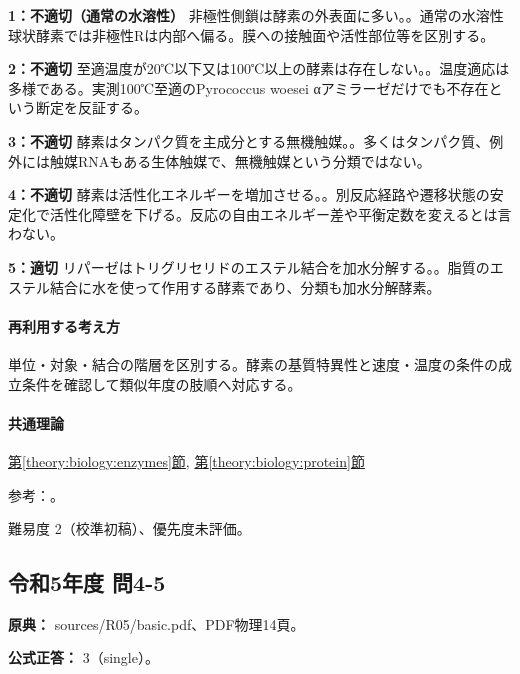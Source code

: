 \noindent\textbf{1：不適切（通常の水溶性）} 非極性側鎖は酵素の外表面に多い。。通常の水溶性球状酵素では非極性Rは内部へ偏る。膜への接触面や活性部位等を区別する。\par

\noindent\textbf{2：不適切} 至適温度が20℃以下又は100℃以上の酵素は存在しない。。温度適応は多様である。実測100℃至適のPyrococcus woesei αアミラーゼだけでも不存在という断定を反証する。\par

\noindent\textbf{3：不適切} 酵素はタンパク質を主成分とする無機触媒。。多くはタンパク質、例外には触媒RNAもある生体触媒で、無機触媒という分類ではない。\par

\noindent\textbf{4：不適切} 酵素は活性化エネルギーを増加させる。。別反応経路や遷移状態の安定化で活性化障壁を下げる。反応の自由エネルギー差や平衡定数を変えるとは言わない。\par

\noindent\textbf{5：適切} リパーゼはトリグリセリドのエステル結合を加水分解する。。脂質のエステル結合に水を使って作用する酵素であり、分類も加水分解酵素。\par

\paragraph{再利用する考え方} 単位・対象・結合の階層を区別する。酵素の基質特異性と速度・温度の条件の成立条件を確認して類似年度の肢順へ対応する。

\paragraph{共通理論} \hyperref[theory:biology:enzymes]{第\ref*{theory:biology:enzymes}節}, \hyperref[theory:biology:protein]{第\ref*{theory:biology:protein}節}

\par 参考：\cite{iubmb_lipase,hyper_amylase}。

\par 難易度 2（校準初稿）、優先度未評価。

\subsection{令和5年度 問4-5}
\label{q:r05-reg-basic-4-5}

\noindent\textbf{原典：} sources/R05/basic.pdf、PDF物理14頁。

\textbf{公式正答：} 3（single）。


